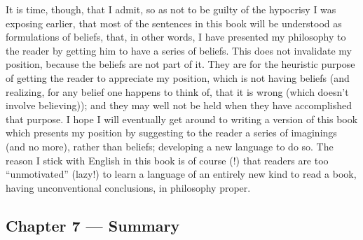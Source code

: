 It is time, though, that I admit, so as not to be guilty of the hypocrisy I 
was exposing earlier, that most of the sentences in this book will be 
understood as formulations of beliefs, that, in other words, I have presented 
my philosophy to the reader by getting him to have a series of beliefs. This 
does not invalidate my position, because the beliefs are not part of it. They 
are for the heuristic purpose of getting the reader to appreciate my position, 
which is not having beliefs (and realizing, for any belief one happens to think 
of, that it is wrong (which doesn't involve believing)); and they may well not 
be held when they have accomplished that purpose. I hope I will eventually 
get around to writing a version of this book which presents my position by 
suggesting to the reader a series of imaginings (and no more), rather than 
beliefs; developing a new language to do so. The reason I stick with English 
in this book is of course (!) that readers are too \enquote{unmotivated} (lazy!) to 
learn a language of an entirely new kind to read a book, having 
unconventional conclusions, in philosophy proper. 

\subsection*{Chapter 7 --- Summary}

